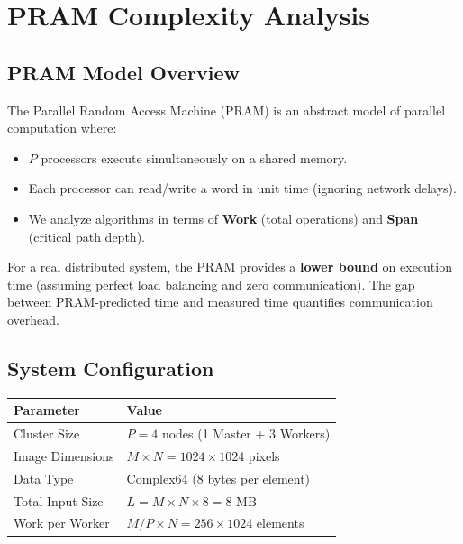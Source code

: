 \documentclass[11pt,a4paper]{article}
\theoremstyle{definition}
\begin{document}
\section{PRAM Complexity Analysis}

\subsection{PRAM Model Overview}

The Parallel Random Access Machine (PRAM) is an abstract model of parallel computation where:
\begin{itemize}
    \item $P$ processors execute simultaneously on a shared memory.
    \item Each processor can read/write a word in unit time (ignoring network delays).
    \item We analyze algorithms in terms of \textbf{Work} (total operations) and \textbf{Span} (critical path depth).
\end{itemize}

For a real distributed system, the PRAM provides a \textbf{lower bound} on execution time (assuming perfect load balancing and zero communication). The gap between PRAM-predicted time and measured time quantifies communication overhead.

\subsection{System Configuration}

\begin{table}[h]
    \centering
    \begin{tabular}{ll}
        \hline
        \textbf{Parameter} & \textbf{Value} \\
        \hline
        Cluster Size & $P = 4$ nodes (1 Master + 3 Workers) \\
        Image Dimensions & $M \times N = 1024 \times 1024$ pixels \\
        Data Type & Complex64 (8 bytes per element) \\
        Total Input Size & $L = M \times N \times 8 = 8\text{ MB}$ \\
        Work per Worker & $M/P \times N = 256 \times 1024$ elements \\
        \hline
    \end{tabular}
\end{table}
\end{document}
